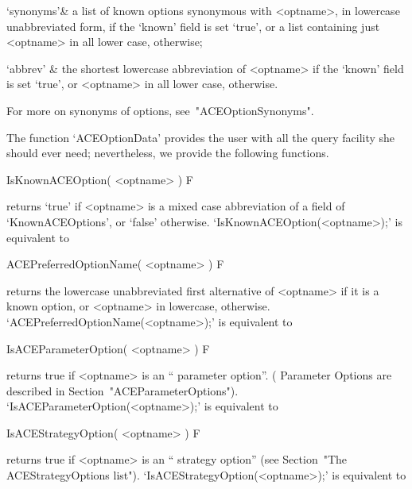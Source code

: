 \quad`synonyms'& a  list  of  known  {\ACE}  options  synonymous  with
<optname>, in lowercase unabbreviated form, if the  `known'  field  is
set `true', or a list containing just <optname>  in  all  lower  case,
otherwise;

\quad`abbrev' & the shortest lowercase abbreviation  of  <optname>  if
the `known' field is set `true',  or  <optname>  in  all  lower  case,
otherwise.

\enditems

For more on synonyms of {\ACE} options, see~"ACEOptionSynonyms".

The function `ACEOptionData' provides the  user  with  all  the  query
facility she should ever need; nevertheless, we provide the  following
functions.

\>IsKnownACEOption( <optname> ) F

returns `true' if <optname> is a mixed case abbreviation of a field of
`KnownACEOptions',           or           `false'           otherwise.
`IsKnownACEOption(<optname>);' is equivalent to

\)

\>ACEPreferredOptionName( <optname> ) F

returns the lowercase unabbreviated first alternative of <optname>  if
it is a known {\ACE} option, or  <optname>  in  lowercase,  otherwise.
`ACEPreferredOptionName(<optname>);' is equivalent to

\)

\>IsACEParameterOption( <optname> ) F

returns true if <optname> is an ``{\ACE} parameter  option''.  ({\ACE}
Parameter Options  are  described  in  Section~"ACEParameterOptions").
`IsACEParameterOption(<optname>);' is equivalent to

\)

\>IsACEStrategyOption( <optname> ) F

returns true if <optname> is  an  ``{\ACE}  strategy  option''  (see
Section~"The                ACEStrategyOptions                 list").
`IsACEStrategyOption(<optname>);' is equivalent to

\)


